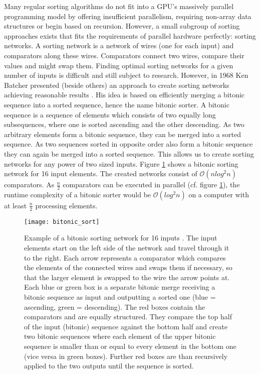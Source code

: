 Many regular sorting algorithms do not fit into a GPU's massively parallel programming model by offering insufficient parallelism, requiring non-array data structures or begin based on recursion. However, a small subgroup of sorting approaches exists that fits the requirements of parallel hardware perfectly: sorting networks. A sorting network is a network of wires (one for each input) and comparators along these wires. Comparators connect two wires, compare their values and might swap them.
Finding optimal sorting networks for a given number of inputs is difficult and still subject to research. However, in 1968 Ken Batcher presented (beside others) an approach to create sorting networks achieving reasonable results \cite{sort_bitonic}. His idea is based on efficiently merging a bitonic sequence into a sorted sequence, hence the name bitonic sorter. A bitonic sequence is a sequence of elements which consists of two equally long subsequences, where one is sorted ascending and the other descending. As two arbitrary elements form a bitonic sequence, they can be merged into a sorted sequence. As two sequences sorted in opposite order also form a bitonic sequence they can again be merged into a sorted sequence. This allows us to create sorting networks for any power of two sized inputs. Figure \ref{fig:bitonic_sort} shows a bitonic sorting network for 16 input elements. The created networks consist of $\mathcal{O}(n  log^2 n)$ comparators. As $\frac{n}{2}$ comparators can be executed in parallel (cf. figure \ref{fig:bitonic_sort}), the runtime complexity of a bitonic sorter would be $\mathcal{O}(log^2 n)$ on a computer with at least $\frac{n}{2}$ processing elements.

\begin{figure}[h]
\centering
\texttt{[image: bitonic\_sort]}
\caption{Example of a bitonic sorting network for 16 inputs \cite{wiki_bitonic_sort}. The input elements start on the left side of the network and travel through it to the right. Each arrow represents a comparator which compares the elements of the connected wires and swaps them if necessary, so that the larger element is swapped to the wire the arrow points at. Each blue or green box is a separate bitonic merge receiving a bitonic sequence as input and outputting a sorted one (blue = ascending, green = descending). The red boxes contain the comparators and are equally structured. They compare the top half of the input (bitonic) sequence against the bottom half and create two bitonic sequences where each element of the upper bitonic sequence is smaller than or equal to every element in the bottom one (vice versa in green boxes). Further red boxes are than recursively applied to the two outputs until the sequence is sorted.}
\label{fig:bitonic_sort}
\end{figure}

